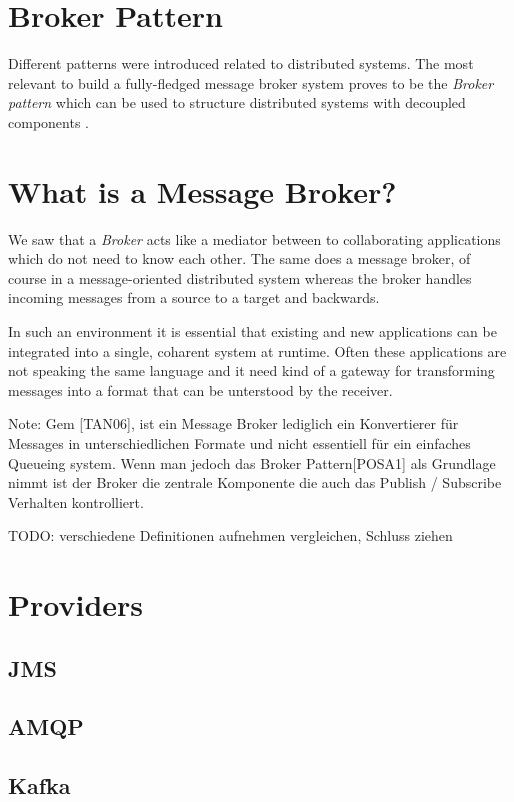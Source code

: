 \section{Broker Pattern}
Different patterns were introduced related to distributed systems. The most
relevant to build a fully-fledged message broker system proves to be the
\textit{Broker pattern} which can be used to structure distributed systems with
decoupled components \cite{POSA1}. 

\section{What is a Message Broker?}
We saw that a \textit{Broker} acts like a mediator between to collaborating
applications which do not need to know each other. The same does a message
broker, of course in a message-oriented distributed system whereas the broker
handles incoming messages from a source to a target and backwards. 

In such an environment it is essential that existing and new applications can be
integrated into a single, coharent system at runtime. Often these applications
are not speaking the same language and it need kind of a gateway for
transforming messages into a format that can be unterstood by the receiver.
\cite{TAN06}

Note: Gem [TAN06], ist ein Message Broker lediglich ein Konvertierer für
Messages in unterschiedlichen Formate und nicht essentiell für ein einfaches
Queueing system. Wenn man jedoch das Broker Pattern[POSA1] als Grundlage nimmt
ist der Broker die zentrale Komponente die auch das Publish / Subscribe
Verhalten kontrolliert. 

TODO: verschiedene Definitionen aufnehmen vergleichen, Schluss ziehen
\section{Providers}
\subsection{JMS}
\subsection{AMQP}
\subsection{Kafka}
\\
